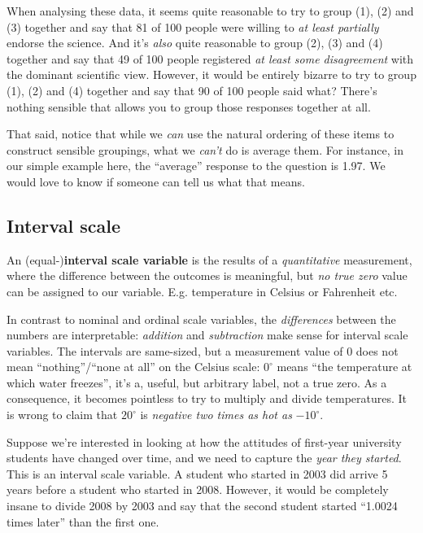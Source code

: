 \documentclass[
  11pt,
  a4paper,
  twoside,symmetric,openright]{book}
\theoremstyle{break}
\theoremstyle{break}
\begin{document}
\begin{example}
When analysing these data, it seems quite reasonable to try to group (1), (2) and (3) together and say that 81 of 100 people were willing to \emph{at least partially} endorse the science. And it's \emph{also} quite reasonable to group (2), (3) and (4) together and say that 49 of 100 people registered \emph{at least some disagreement} with the dominant scientific view. However, it would be entirely bizarre to try to group (1), (2) and (4) together and say that 90 of 100 people said what? There's nothing sensible that allows you to group those responses together at all.

That said, notice that while we \emph{can} use the natural ordering of these items to construct sensible groupings, what we \emph{can't} do is average them. For instance, in our simple example here, the ``average'' response to the question is 1.97. We would love to know if someone can tell us what that means.
\end{example}

\hypertarget{intervalscale}{%
\subsection{Interval scale}\label{intervalscale}}

\begin{definition}
\protect\hypertarget{def:definterval}{}\label{def:definterval}An (equal-)\textbf{interval scale variable} is the results of a \emph{quantitative} measurement, where the difference between the outcomes is meaningful, but \emph{no true zero} value can be assigned to our variable. E.g. temperature in Celsius or Fahrenheit etc.
\end{definition}

In contrast to nominal and ordinal scale variables, the \emph{differences} between the numbers are interpretable: \emph{addition} and \emph{subtraction} make sense for interval scale variables. The intervals are same-sized, but a measurement value of 0 does not mean ``nothing''/``none at all'' on the Celsius scale: \(0^\circ\) means ``the temperature at which water freezes'', it's a, useful, but arbitrary label, not a true zero. As a consequence, it becomes pointless to try to multiply and divide temperatures. It is wrong to claim that \(20^\circ\) is \emph{negative two times as hot as} \(-10^\circ\).

\begin{example}
\protect\hypertarget{exm:exinterval}{}\label{exm:exinterval}Suppose we're interested in looking at how the attitudes of first-year university students have changed over time, and we need to capture the \emph{year they started}. This is an interval scale variable. A student who started in 2003 did arrive 5 years before a student who started in 2008. However, it would be completely insane to divide 2008 by 2003 and say that the second student started ``1.0024 times later'' than the first one.
\end{example}
\end{document}
